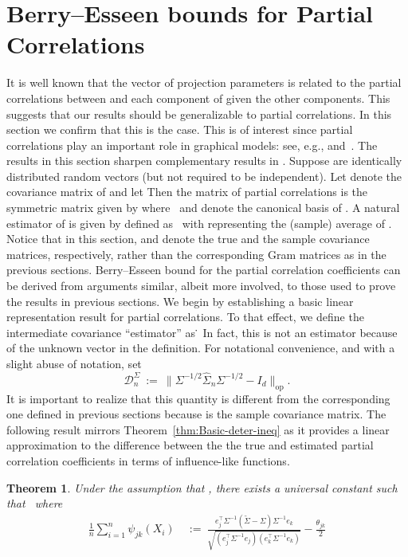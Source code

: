 \documentclass{article}
\newtheorem{theorem}{Theorem}
\begin{document}
\section{Berry--Esseen bounds for Partial Correlations}
\label{section::partial}
It is well known that the vector of projection parameters is related to the
partial correlations between   and each component of   given
the other components.
This suggests that our results should be generalizable to
partial correlations.
In this section we confirm that this is the case.
This is of interest since partial correlations
play an important role in graphical models: see, e.g., \cite{Lau96} and~\cite{drton2004model}. The results in this section sharpen complementary results in \cite{wasserman2014berry}.
Suppose   are identically distributed random vectors (but not required to be independent). Let   denote the   covariance matrix of   and let   Then the   matrix of partial correlations is the symmetric matrix given by   where
\ and   denote the canonical basis of  . A natural estimator of   is given by   defined as
\ with   representing the (sample) average of  . Notice that in this section,   and   denote the true and the sample covariance matrices, respectively,
rather than the corresponding Gram matrices as in the previous sections.
Berry--Esseen bound for the partial correlation coefficients can be derived from arguments similar, albeit more involved,
to those used to prove the results in previous sections. We begin by establishing a basic linear representation result for partial correlations. To that effect, we define the intermediate covariance ``estimator'' as
\.
\]
In fact, this is not an estimator because of the unknown vector   in the definition. For notational convenience, and with a slight abuse of notation, set
\begin{equation}\label{eq:D-sigma-notation}
\mathcal{D}_n^{\Sigma} ~:=~ \|\Sigma^{-1/2}\widehat{\Sigma}_n\Sigma^{-1/2} - I_d\|_{\mathrm{op}}.
\end{equation}
It is important to realize that this quantity is different from the corresponding one defined in previous sections because   is the sample covariance matrix.
The following result mirrors Theorem~\ref{thm:Basic-deter-ineq} as it provides a linear approximation to the difference between the the true and estimated partial correlation coefficients in terms of influence-like functions.
\begin{theorem}\label{thm:linear-expansion-partial-corr}
Under the assumption that  , there exists a universal constant   such that
\ where
\begin{equation}
\begin{split}
\frac{1}{n}\sum_{i=1}^n \psi_{jk}(X_i) ~&:=~ \frac{e_j^{\top}\Sigma^{-1}(\widetilde{\Sigma} - \Sigma)\Sigma^{-1}e_k}{\sqrt{(e_j^{\top}\Sigma^{-1}e_j)(e_k^{\top}\Sigma^{-1}e_k)}}
- \frac{\theta_{jk}}{2}\left.
\end{split}
\end{equation}
\end{theorem}
\end{document}

